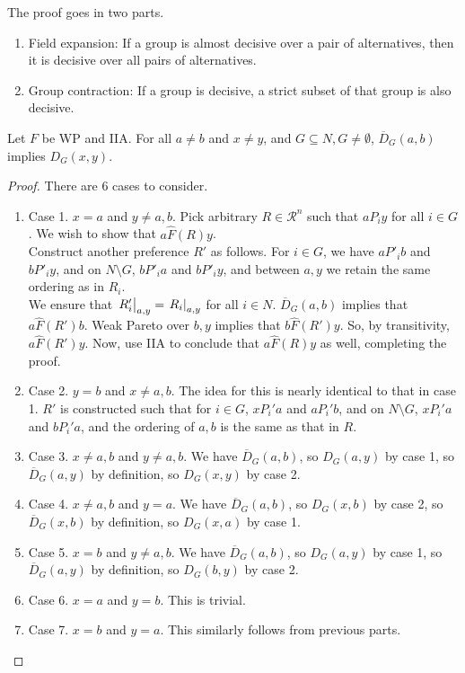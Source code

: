 	The proof goes in two parts.
	\begin{enumerate}
		\item Field expansion: If a group is almost decisive over a pair of alternatives, then it is decisive over all pairs of alternatives.
		\item Group contraction: If a group is decisive, a strict subset of that group is also decisive.
	\end{enumerate}

	\begin{lemma}
		\label{lem: arrow field expansion}
		Let $F$ be WP and IIA. For all $a \ne b$ and $x \ne y$, and $G \subseteq N, G \ne \emptyset$,
		$\overline{D}_G(a,b)$ implies $D_G(x,y)$.
	\end{lemma}
	\begin{proof}
		There are $6$ cases to consider.
		\begin{enumerate}
			\item Case 1. $x = a$ and $y \ne a,b$. Pick arbitrary $R \in \mathcal{R}^n$ such that $a P_i y$ for all $i \in G$. We wish to show that $a \hat{F}(R) y$.\\
			Construct another preference $R'$ as follows. For $i \in G$, we have $a P'_i b$ and $b P'_i y$, and on $N \setminus G$, $b P'_i a$ and $b P'_i y$, and between $a,y$ we retain the same ordering as in $R_i$.\\
			We ensure that $\left.R_i'\right|_{a,y} = \left.R_i\right|_{a,y}$ for all $i \in N$. $\overline{D}_G(a,b)$ implies that $a \hat{F}(R') b$. Weak Pareto over $b,y$ implies that $b \hat{F}(R') y$. So, by transitivity, $a \hat{F}(R') y$. Now, use IIA to conclude that $a \hat{F}(R) y$ as well, completing the proof.
			\item Case 2. $y = b$ and $x \ne a,b$. The idea for this is nearly identical to that in case 1. $R'$ is constructed such that for $i \in G$, $x P_i' a$ and $a P_i' b$, and on $N \setminus G$, $x P_i' a$ and $b P_i' a$, and the ordering of $a,b$ is the same as that in $R$.
			\item Case 3. $x \ne a,b$ and $y \ne a,b$. We have $\overline{D}_G(a,b)$, so $D_G(a,y)$ by case 1, so $\overline{D}_G(a,y)$ by definition, so $D_G(x,y)$ by case 2.
			\item Case 4. $x \ne a,b$ and $y = a$. We have $\overline{D}_G(a,b)$, so $D_G(x,b)$ by case 2, so $\overline{D}_G(x,b)$ by definition, so $D_G(x,a)$ by case 1.
			\item Case 5. $x = b$ and $y \ne a,b$. We have $\overline{D}_G(a,b)$, so $D_G(a,y)$ by case 1, so $\overline{D}_G(a,y)$ by definition, so $D_G(b,y)$ by case 2.
			\item Case 6. $x = a$ and $y = b$. This is trivial.
			\item Case 7. $x = b$ and $y = a$. This similarly follows from previous parts.
		\end{enumerate}
	\end{proof}

